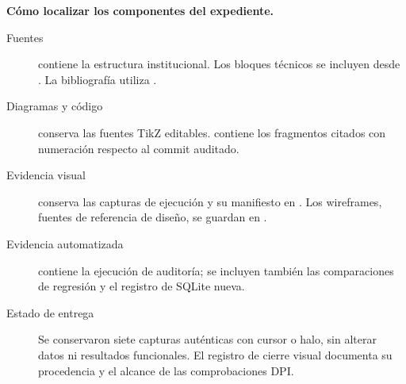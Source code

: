 \textbf{Cómo localizar los componentes del expediente.}\par
\begin{description}
\item[Fuentes]  contiene la estructura institucional. Los bloques técnicos se incluyen desde . La bibliografía utiliza .
\item[Diagramas y código]  conserva las fuentes TikZ editables.  contiene los fragmentos citados con numeración respecto al commit auditado.
\item[Evidencia visual]  conserva las capturas de ejecución y su manifiesto en . Los wireframes, fuentes de referencia de diseño, se guardan en .
\item[Evidencia automatizada]  contiene la ejecución de auditoría; se incluyen también las comparaciones de regresión y el registro de SQLite nueva.
\item[Estado de entrega] Se conservaron siete capturas auténticas con cursor o halo, sin alterar datos ni resultados funcionales. El registro de cierre visual documenta su procedencia y el alcance de las comprobaciones DPI.
\end{description}

